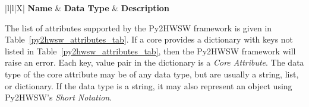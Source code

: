 %
%

\begin{xltabular}{\textwidth}{|l|l|X|}
  \hline
  {\bf Name} & {\bf Data Type} & {\bf Description}  \\ \hline \hline
  \endhead

  

  \caption{Table of supported Py2HWSW attributes in the \textbf{Core Dictionary}. The \textit{Data Type} column specifies the type of internal object that the Py2HWSW will convert the attribute's value to (usually the user inputs a string, list, or dictionary value and then py2 converts it to an internal object).}
  \label{py2hwsw_attributes_tab}
\end{xltabular}

The list of attributes supported by the Py2HWSW framework is given in Table~\ref{py2hwsw_attributes_tab}.
If a core provides a dictionary with keys not listed in Table~\ref{py2hwsw_attributes_tab}, then the Py2HWSW framework will raise an error.
Each key, value pair in the dictionary is a \textit{Core Attribute}.
The data type of the core attribute may be of any data type, but are usually a string, list, or dictionary.
If the data type is a string, it may also represent an object using Py2HWSW's \textit{Short Notation}.
